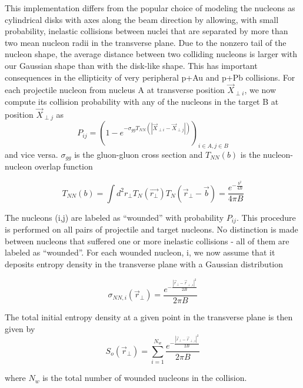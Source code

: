 \documentclass[preprint,showpacs,amsfonts,aps,prl,nofootinbib,floatfix]{revtex4}
\begin{document}
This implementation differs from the popular choice of modeling the nucleons as cylindrical disks with axes along the beam direction by allowing, with small probability, inelastic collisions between nuclei that are separated by more than two mean nucleon radii in the transverse plane. Due to the nonzero tail of the nucleon shape, the average distance between two colliding nucleons is larger with our Gaussian shape than with the disk-like shape.  This has important consequences in the ellipticity of very peripheral p+Au and p+Pb collisions. For each projectile nucleon from nucleus A at transverse position $\vec{X}_{\perp i}$, we now compute its collision probability with any of the nucleons in the target B at position  $\vec{X}_{\perp j}$ as
\begin{equation}
	P_{ij} = (1-e^{-\sigma_{gg} T_{NN}(|\vec{X}_{\perp i}-\vec{X}_{\perp j}|)})_{i\in A, j\in B}
	\label{eq:CollisionProb}
\end{equation}
and vice versa. $\sigma_{gg}$ is the gluon-gluon cross section and $T_{NN}(b)$ is the nucleon-nucleon overlap function  \cite{Heinz:2011mh}

\begin{equation}
	\label{eq:NuclearOverlap}
	T_{NN}(b) = \int d^2 r_{\perp} T_{N}(\vec{r_{\perp}}) T_{N}(\vec{r}_{\perp}-\vec{b}) = \frac{e^{-\frac{b^2}{4B}}}{4\pi B}
\end{equation}

The nucleons (i,j) are labeled as “wounded” with probability $P_{ij}$. This procedure is performed on all pairs of projectile and target nucleons. No distinction is made between nucleons that suffered one or more inelastic collisions - all of them are labeled as “wounded”. For each wounded nucleon, i, we now assume that it deposits entropy density in the transverse plane with a Gaussian distribution 

\begin{equation}
	\sigma_{NN,i}(\vec{r}_{\perp}) = \frac{e^{-\frac{|\vec{r}_{\perp}-\vec{r}_{\perp,i}|^2}{2B}}}{2\pi B}
\end{equation}

The total initial entropy density at a given point in the transverse plane is then given by
\begin{equation}
	S_{o}(\vec{r}_{\perp}) = \sum\limits_{i=1}^{N_{w}} \frac{e^{-\frac{|\vec{r}_{\perp}-\vec{r}_{\perp,i}|^2}{2B}}}{2\pi B}
\end{equation}

where $N_{w}$ is the total number of wounded nucleons in the collision. 
\end{document}
